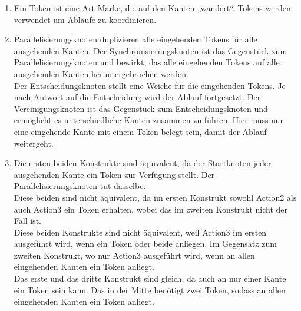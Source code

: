 \documentclass[a4paper, 12pt, margins=2.5cm]{homework}
\begin{document}
  
  \begin{problem}
    
  \end{problem}
  \begin{solution}\hfill
    \begin{enumerate}[label=\alph*)]\itemsep0pt
      \item Ein Token ist eine Art Marke, die auf den Kanten „wandert“. Tokens 
            werden verwendet um Abläufe zu koordinieren.

      \item Parallelisierungsknoten duplizieren alle eingehenden Tokens für alle
            ausgehenden Kanten. Der Synchronisierungsknoten ist das Gegenstück zum
            Parallelisierungsknoten und bewirkt, das alle eingehenden Tokens auf
            alle ausgehenden Kanten heruntergebrochen werden. \\
            Der Entscheidungsknoten stellt eine Weiche für die eingehenden Tokens.
            Je nach Antwort auf die Entscheidung wird der Ablauf fortgesetzt.
            Der Vereinigungsknoten ist das Gegenstück zum Entscheidungsknoten
            und ermöglicht es unterschiedliche Kanten zusammen zu führen. Hier 
            muss nur eine eingehende Kante mit einem Token belegt sein, damit 
            der Ablauf weitergeht.

      \item Die ersten beiden Konstrukte sind äquivalent, da der Startknoten jeder
            ausgehenden Kante ein Token zur Verfügung stellt. Der Parallelisierungsknoten
            tut dasselbe. \\
            Diese beiden sind nicht äquivalent, da im ersten Konstrukt sowohl Action2
            als auch Action3 ein Token erhalten, wobei das im zweiten Konstrukt
            nicht der Fall ist. \\
            Diese beiden Konstrukte sind nicht äquivalent, weil Action3 im ersten
            ausgeführt wird, wenn ein Token oder beide anliegen. Im Gegensatz
            zum zweiten Konstrukt, wo nur Action3 ausgeführt wird, wenn an allen
            eingehenden Kanten ein Token anliegt. \\
            Das erste und das dritte Konstrukt sind gleich, da auch an nur einer
            Kante ein Token sein kann. Das in der Mitte benötigt zwei Token, sodass
            an allen eingehenden Kanten ein Token anliegt.
    \end{enumerate}
    
  \end{solution}
  
\end{document}

